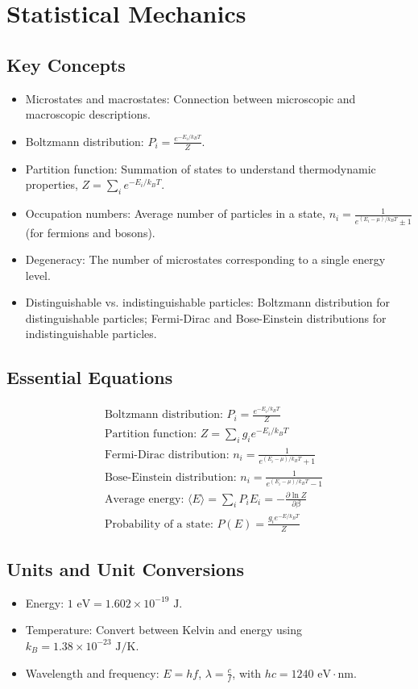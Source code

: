 \documentclass{article}
\newcommand{\eqbox}[1]{\begin{tcolorbox}[colback=gray!10] #1 \end{tcolorbox}}
\newcommand{\conceptbox}[1]{\begin{tcolorbox}[colback=blue!10] #1 \end{tcolorbox}}
\newcommand{\tipbox}[1]{\begin{tcolorbox}[colback=green!10] #1 \end{tcolorbox}}
\begin{document}
\section{Statistical Mechanics}

\subsection{Key Concepts}
\conceptbox{
\begin{itemize}
    \item Microstates and macrostates: Connection between microscopic and macroscopic descriptions.
    \item Boltzmann distribution: $P_i = \frac{e^{-E_i/k_BT}}{Z}$.
    \item Partition function: Summation of states to understand thermodynamic properties, $Z = \sum_i e^{-E_i/k_BT}$.
    \item Occupation numbers: Average number of particles in a state, $n_i = \frac{1}{e^{(E_i-\mu)/k_BT} \pm 1}$ (for fermions and bosons).
    \item Degeneracy: The number of microstates corresponding to a single energy level.
    \item Distinguishable vs. indistinguishable particles: Boltzmann distribution for distinguishable particles; Fermi-Dirac and Bose-Einstein distributions for indistinguishable particles.
\end{itemize}
}

\subsection{Essential Equations}
\eqbox{
\begin{align*}
    &\text{Boltzmann distribution: } P_i = \frac{e^{-E_i/k_BT}}{Z} \\
    &\text{Partition function: } Z = \sum_i g_i e^{-E_i/k_BT} \\
    &\text{Fermi-Dirac distribution: } n_i = \frac{1}{e^{(E_i-\mu)/k_BT} + 1} \\
    &\text{Bose-Einstein distribution: } n_i = \frac{1}{e^{(E_i-\mu)/k_BT} - 1} \\
    &\text{Average energy: } \langle E \rangle = \sum_i P_i E_i = -\frac{\partial \ln Z}{\partial \beta} \\
    &\text{Probability of a state: } P(E) = \frac{g_i e^{-E/k_BT}}{Z}
\end{align*}
}

\subsection{Units and Unit Conversions}
\tipbox{
\begin{itemize}
    \item Energy: $1 \text{ eV} = 1.602 \times 10^{-19} \text{ J}$.
    \item Temperature: Convert between Kelvin and energy using $k_B = 1.38 \times 10^{-23} \text{ J/K}$.
    \item Wavelength and frequency: $E = hf$, $\lambda = \frac{c}{f}$, with $hc = 1240 \text{ eV} \cdot \text{nm}$.
\end{itemize}
}
\end{document}
